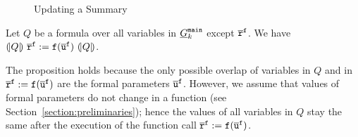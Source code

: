 \begin{figure}[t]
  \centering

  \caption{Updating a Summary}
  \label{figure:updating-summary}
\end{figure}
\begin{proposition}
\label{propposition:invariant}
Let $Q$ be a formula over all variables in $\underline{G}^{\mathtt{{main}}}_k$ except $\mathtt{\overline{r}}^{\mathtt{{f}}}$.
We have $(\!| {Q} |\!)\
  \mathtt{\overline{r}}^{\mathtt{{f}}} := \mathtt{f}
  (\overline{\mathtt{u}}^{\mathtt{{f}}})\ (\!| {Q} |\!)$.
\end{proposition}
The proposition holds because the only possible overlap of variables in $Q$ and in $\mathtt{\overline{r}}^{\mathtt{{f}}} := \mathtt{f} (\overline{\mathtt{u}}^{\mathtt{{f}}})$ are the formal parameters $\overline{\mathtt{u}}^{\mathtt{{f}}}$. However, we assume that values of formal parameters do not change in a function (see Section~\ref{section:preliminaries}); hence the values of all variables in $Q$ stay the same after the execution of the function call $\mathtt{\overline{r}}^{\mathtt{{f}}} := \mathtt{f} (\overline{\mathtt{u}}^{\mathtt{{f}}})$.


